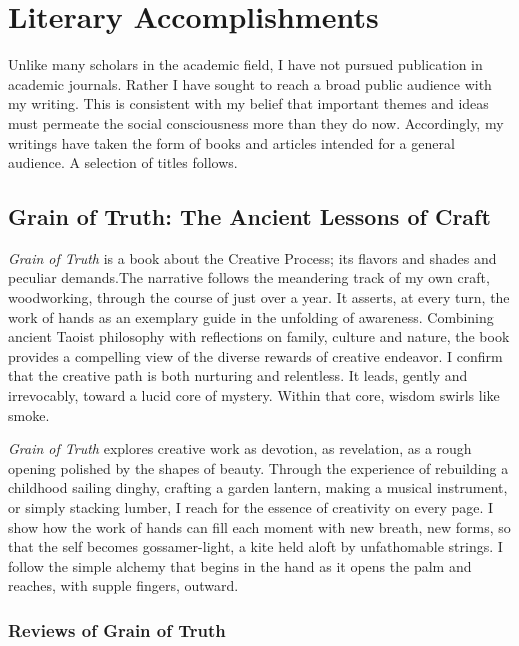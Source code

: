 \documentclass[10pt,DIV09,letterpaper,oneside,headsepline]{scrreprt}
\begin{document}
\chapter{Literary Accomplishments}

Unlike many scholars in the academic field, I have not pursued publication in academic journals. Rather I have sought to reach a broad public audience with my writing. This is consistent with my belief that important themes and ideas must permeate the social consciousness more than they do now. Accordingly, my writings have taken the form of books and articles intended for a general audience. A selection of titles follows.

\clearpage

\section{Grain of Truth: The Ancient Lessons of Craft}

\textit{Grain of Truth} is a book about the Creative Process; its flavors and shades and peculiar demands.The narrative follows the meandering track of my own craft, woodworking, through the course of just over a year. It asserts, at every turn, the work of hands as an exemplary guide in the unfolding of awareness. Combining ancient Taoist philosophy with reflections on family, culture and nature, the book provides a compelling view of the diverse rewards of creative endeavor. I confirm that the creative path is both nurturing and relentless. It leads, gently and irrevocably, toward a lucid core of mystery. Within that core, wisdom swirls like smoke.

\textit{Grain of Truth} explores creative work as devotion, as revelation, as a rough opening polished by the shapes of beauty. Through the experience of rebuilding a childhood sailing dinghy, crafting a garden lantern, making a musical instrument, or simply stacking lumber, I reach for the essence of creativity on every page. I show how the work of hands can fill each moment with new breath, new forms, so that the self becomes gossamer-light, a kite held aloft by unfathomable strings. I follow the simple alchemy that begins in the hand as it opens the palm and reaches, with supple fingers, outward.

\subsection{Reviews of Grain of Truth}
\end{document}
